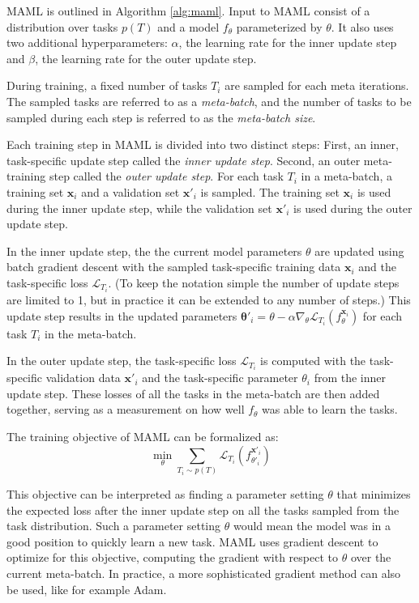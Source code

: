 \gls{MAML} is outlined in Algorithm \ref{alg:maml}. Input to \gls{MAML} consist of a distribution over tasks $p(T)$ and a model $f_{\theta}$ parameterized by $\theta$. It also uses two additional hyperparameters: $\alpha$, the learning rate for the inner update step and $\beta$, the learning rate for the outer update step.

During training, a fixed number of tasks $T_i$ are sampled for each meta iterations. The sampled tasks are referred to as a \textit{meta-batch}, and the number of tasks to be sampled during each step is referred to as the \textit{meta-batch size}. 

Each training step in \gls{MAML} is divided into two distinct steps: First, an inner, task-specific update step called the \textit{inner update step}. Second, an outer meta-training step called the \textit{outer update step}. For each task $T_i$ in a meta-batch, a training set $\mathbf{x}_i$ and a validation set $\mathbf{x}'_i$ is sampled. The training set $\mathbf{x}_i$ is used during the inner update step, while the validation set $\mathbf{x}'_i$ is used during the outer update step.

In the inner update step, the the current model parameters $\theta$ are updated using batch gradient descent with the sampled task-specific training data $\mathbf{x}_{i}$ and the task-specific loss $\mathcal{L}_{T_i}$. (To keep the notation simple the number of update steps are limited to 1, but in practice it can be extended to any number of steps.) This update step results in the updated parameters $\mathbf{\theta}'_{i} = \theta- \alpha\nabla_{\theta}\mathcal{L}_{T_i}\left(f_{\theta}^{\mathbf{x}_{i}}\right)$ for each task $T_i$ in the meta-batch. 

In the outer update step, the task-specific loss $\mathcal{L}_{T_i}$ is computed with the task-specific validation data $\mathbf{x}'_{i}$ and the task-specific parameter $\theta_i$ from the inner update step. These losses of all the tasks in the meta-batch are then added together, serving as a measurement on how well $f_{\theta}$ was able to learn the tasks. 

The training objective of \gls{MAML} can be formalized as:
\begin{equation} \min_{\theta} \sum_{T_i \sim p(T)} \mathcal{L}_{T_i}\left(f_{\theta'_i}^{\mathbf{x}'_{i}}\right)\end{equation}

This objective can be interpreted as finding a parameter setting $\theta$ that minimizes the expected loss after the inner update step on all the tasks sampled from the task distribution. Such a parameter setting $\theta$ would mean the model was in a good position to quickly learn a new task. \gls{MAML} uses gradient descent to optimize for this objective, computing the gradient with respect to $\theta$ over the current meta-batch. In practice, a more sophisticated gradient method can also be used, like for example Adam.

